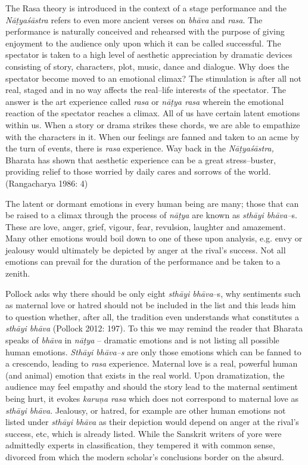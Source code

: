 The Rasa theory is introduced in the context of a stage performance and the \textit{Nāṭyaśāstra }refers to even more ancient verses on \textit{bhāva} and \textit{rasa}. The performance is naturally conceived and rehearsed with the purpose of giving enjoyment to the audience only upon which it can be called successful. The spectator is taken to a high level of aesthetic appreciation by dramatic devices consisting of story, characters, plot, music, dance and dialogue. Why does the spectator become moved to an emotional climax? The stimulation is after all not real, staged and in no way affects the real–life interests of the spectator. The answer is the art experience called \textit{rasa} or \textit{nāṭya rasa} wherein the emotional reaction of the spectator reaches a climax. All of us have certain latent emotions within us. When a story or drama strikes these chords, we are able to empathize with the characters in it. When our feelings are fanned and taken to an acme by the turn of events, there is \textit{rasa} experience. Way back in the \textit{Nāṭyaśāstra,} Bharata has shown that aesthetic experience can be a great stress–buster, providing relief to those worried by daily cares and sorrows of the world. (Rangacharya 1986: 4)

The latent or dormant emotions in every human being are many; those that can be raised to a climax through the process of \textit{nāṭya} are known as \textit{sthāyi bhāva–}s. These are love, anger, grief, vigour, fear, revulsion, laughter and amazement. Many other emotions would boil down to one of these upon analysis, e.g. envy or jealousy would ultimately be depicted by anger at the rival’s success. Not all emotions can prevail for the duration of the performance and be taken to a zenith.

Pollock asks why there should be only eight \textit{sthāyi bhāva}–s, why sentiments such as maternal love or hatred should not be included in the list and this leads him to question whether, after all, the tradition even understands what constitutes a \textit{sthāyi bhāva }(Pollock 2012: 197). To this we may remind the reader that Bharata speaks of \textit{bhāva} in \textit{nāṭya} – dramatic emotions and is not listing all possible human emotions. \textit{Sthāyi bhāva–s} are only those emotions which can be fanned to a crescendo, leading to \textit{rasa} experience. Maternal love is a real, powerful human (and animal) emotion that exists in the real world. Upon dramatization, the audience may feel empathy and should the story lead to the maternal sentiment being hurt, it evokes \textit{karuṇa rasa} which does not correspond to maternal love as \textit{sthāyi bhāva}. Jealousy, or hatred, for example are other human emotions not listed under \textit{sthāyi bhāva} as their depiction would depend on anger at the rival’s success, etc, which is already listed. While the Sanskrit writers of yore were admittedly experts in classification, they tempered it with common sense, divorced from which the modern scholar’s conclusions border on the absurd.

